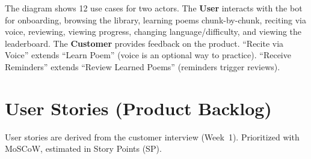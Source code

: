 \documentclass[11pt, a4paper]{article}
\begin{document}
The diagram shows 12 use cases for two actors. The \textbf{User} interacts with the bot for onboarding, browsing the library, learning poems chunk-by-chunk, reciting via voice, reviewing, viewing progress, changing language/difficulty, and viewing the leaderboard. The \textbf{Customer} provides feedback on the product. ``Recite via Voice'' extends ``Learn Poem'' (voice is an optional way to practice). ``Receive Reminders'' extends ``Review Learned Poems'' (reminders trigger reviews).


\section{User Stories (Product Backlog)}

User stories are derived from the customer interview (Week~1). Prioritized with MoSCoW, estimated in Story Points (SP).
\end{document}
